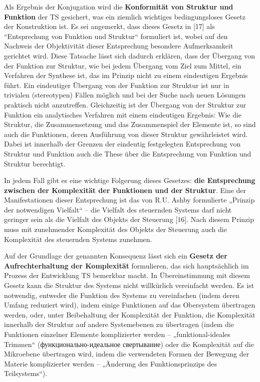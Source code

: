 \documentclass[11pt,a4paper]{article}
\begin{document}
Als Ergebnis der Konjugation wird die \textbf{Konformität von Struktur und
  Funktion} der TS gesichert, was ein ziemlich wichtiges bedingungsloses
Gesetz der Konstruktion ist. Es sei angemerkt, dass dieses Gesetz in [17] als
“Entsprechung von Funktion und Struktur“ formuliert ist, wobei auf den
Nachweis der Objektivität dieser Entsprechung besondere Aufmerksamkeit
gerichtet wird. Diese Tatsache lässt sich dadurch erklären, dass der Übergang
von der Funktion zur Struktur, wie bei jedem Übergang vom Ziel zum Mittel, ein
Verfahren der Synthese ist, das im Prinzip nicht zu einem eindeutigen Ergebnis
führt. Ein eindeutiger Übergang von der Funktion zur Struktur ist nur in
trivialen (stereotypen) Fällen möglich und bei der Suche nach neuen Lösungen
praktisch nicht anzutreffen. Gleichzeitig ist der Übergang von der Struktur
zur Funktion ein analytisches Verfahren mit einem eindeutigen Ergebnis: Wie
die Struktur, die Zusammensetzung und das Zusammenspiel der Elemente ist, so
sind auch die Funktionen, deren Ausführung von dieser Struktur gewährleistet
wird.  Dabei ist innerhalb der Grenzen der eindeutig festgelegten Entsprechung
von Struktur und Funktion auch die These über die Entsprechung von Funktion
und Struktur berechtigt.

In jedem Fall gibt es eine wichtige Folgerung dieses Gesetzes: \textbf{die
  Entsprechung zwischen der Komplexität der Funktionen und der Struktur}. Eine
der Manifestationen dieser Entsprechung ist das von R.U. Ashby formulierte
„Prinzip der notwendigen Vielfalt“ -- die Vielfalt des steuernden Systems darf
nicht geringer sein als die Vielfalt des Objekts der Steuerung [16]. Nach
diesem Prinzip muss mit zunehmender Komplexität des Objekts der Steuerung auch
die Komplexität des steuernden Systems zunehmen.

Auf der Grundlage der genannten Konsequenz lässt sich ein \textbf{Gesetz der
  Aufrechterhaltung der Komplexität} formulieren, das sich hauptsächlich im
Prozess der Entwicklung TS bemerkbar macht. In Übereinstimmung mit diesem
Gesetz kann die Struktur des Systems nicht willkürlich vereinfacht werden. Es
ist notwendig, entweder die Funktion des Systems zu vereinfachen (indem deren
Umfang reduziert wird), indem einige Funktionen auf das Obersystem übertragen
werden, oder, unter Beibehaltung der Komplexität der Funktion, die Komplexität
innerhalb der Struktur auf andere Systemebenen zu übertragen (indem die
Funktionen einzelner Elemente komplizierter werden -- „funktional-ideales
Trimmen“ (\foreignlanguage{russian}{функционально-идеальное свертывание}) oder
die Komplexität auf die Mikroebene übertragen wird, indem die verwendeten
Formen der Bewegung der Materie komplizierter werden -- „Änderung des
Funktionsprinzips des Teilsystems“).
\end{document}
